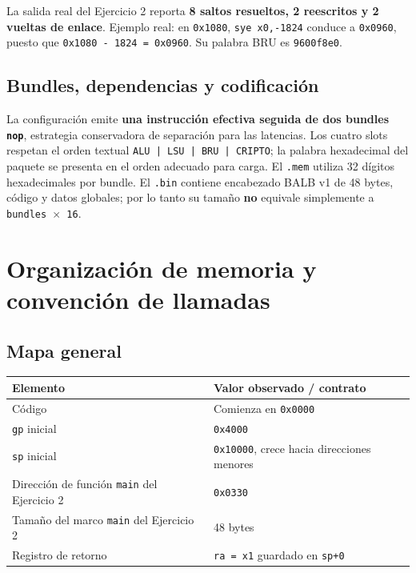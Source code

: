 La salida real del Ejercicio 2 reporta \textbf{8 saltos resueltos, 2
reescritos y 2 vueltas de enlace}. Ejemplo real: en
\texttt{0x1080}, \texttt{sye x0,-1824}
conduce a \texttt{0x0960}, puesto que
\texttt{0x1080 - 1824 = 0x0960}. Su palabra BRU es
\texttt{9600f8e0}.

\subsection{Bundles, dependencias y
codificación}\label{58-bundles-dependencias-y-codificaciuxf3n}

La configuración emite \textbf{una instrucción efectiva
seguida de dos bundles \texttt{nop}}, estrategia
conservadora de separación para las latencias. Los cuatro slots respetan
el orden textual \texttt{ALU | LSU | BRU | CRIPTO}; la
palabra hexadecimal del paquete se presenta en el orden adecuado para
carga. El \texttt{.mem} utiliza 32 dígitos
hexadecimales por bundle. El \texttt{.bin} contiene
encabezado BALB v1 de 48 bytes, código y datos globales; por lo tanto su
tamaño \textbf{no} equivale simplemente a
\texttt{bundles $\times$ 16}.

\section{Organización de memoria y convención de
llamadas}\label{6-organizacion-de-memoria-y-convencion-de-llamadas}

\subsection{Mapa general}\label{61-mapa-general}

\begin{longtable}[]{@{}p{0.5\linewidth}p{0.5\linewidth}@{}}
\toprule\noalign{}
Elemento & Valor observado / contrato \\
\midrule\noalign{}
\endhead
\bottomrule\noalign{}
\endlastfoot
Código & Comienza en \texttt{0x0000} \\
\texttt{gp} inicial &
\texttt{0x4000} \\
\texttt{sp} inicial &
\texttt{0x10000}, crece hacia direcciones menores \\
Dirección de función \texttt{main} del Ejercicio 2 &
\texttt{0x0330} \\
Tamaño del marco \texttt{main} del Ejercicio 2 & 48
bytes \\
Registro de retorno & \texttt{ra = x1} guardado en
\texttt{sp+0} \\
\end{longtable}

